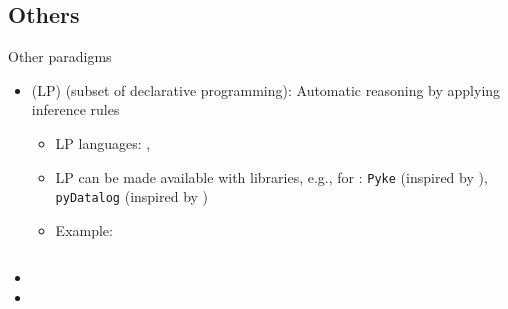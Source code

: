 \subsection{Others}




\begin{frame}{Other paradigms}
	\begin{itemize}
		\item {} (LP) (subset of declarative programming): Automatic reasoning by applying inference rules
		\begin{itemize}
			\item LP languages: , 
			\item LP can be made available with libraries, e.g., for : \texttt{Pyke} (inspired by ), \texttt{pyDatalog} (inspired by )
			\item Example:
			\inputminted[]{prolog}{code/paradigms/lp/siblings.pl}
		\end{itemize}
		\item {}
		\item {}
	\end{itemize}
\end{frame}
